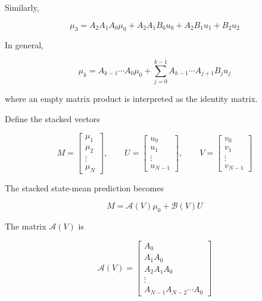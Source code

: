 Similarly,

\begin{equation}
    \mu_3
    =
    A_2A_1A_0\mu_0
    +
    A_2A_1B_0u_0
    +
    A_2B_1u_1
    +
    B_2u_2
\end{equation}

In general,

\begin{equation}
    \mu_k
    =
    A_{k-1}\cdots A_0\mu_0
    +
    \sum_{j=0}^{k-1}
    A_{k-1}\cdots A_{j+1}B_ju_j
\end{equation}

where an empty matrix product is interpreted as the identity matrix.

Define the stacked vectors

\begin{equation}
    M=
    \begin{bmatrix}
        \mu_1\\
        \mu_2\\
        \vdots\\
        \mu_N
    \end{bmatrix},
    \qquad
    U=
    \begin{bmatrix}
        u_0\\
        u_1\\
        \vdots\\
        u_{N-1}
    \end{bmatrix},
    \qquad
    V=
    \begin{bmatrix}
        v_0\\
        v_1\\
        \vdots\\
        v_{N-1}
    \end{bmatrix}
\end{equation}

The stacked state-mean prediction becomes

\begin{equation}
    \boxed{
    M
    =
    \mathcal{A}(V)\mu_0
    +
    \mathcal{B}(V)U
    }
\end{equation}

The matrix \(\mathcal{A}(V)\) is

\begin{equation}
    \mathcal{A}(V)
    =
    \begin{bmatrix}
        A_0\\
        A_1A_0\\
        A_2A_1A_0\\
        \vdots\\
        A_{N-1}A_{N-2}\cdots A_0
    \end{bmatrix}
\end{equation}

